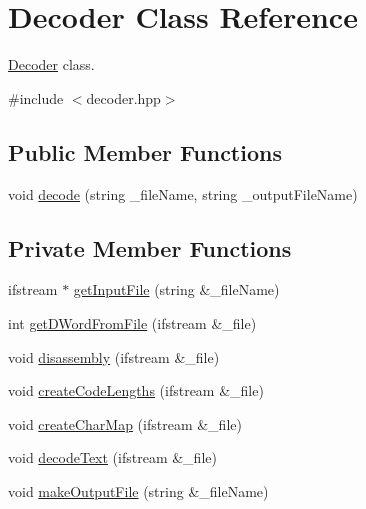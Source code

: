 \hypertarget{classDecoder}{}\section{Decoder Class Reference}
\label{classDecoder}


\hyperlink{classDecoder}{Decoder} class.  




{\ttfamily \#include $<$decoder.\+hpp$>$}

\subsection*{Public Member Functions}
\begin{DoxyCompactItemize}
\item 
void \hyperlink{classDecoder_a58a00f7fcc05d4734727309c2725375f}{decode} (string \+\_\+file\+Name, string \+\_\+output\+File\+Name)
\end{DoxyCompactItemize}
\subsection*{Private Member Functions}
\begin{DoxyCompactItemize}
\item 
ifstream $\ast$ \hyperlink{classDecoder_a27c84988ad41e51a3c968bbc3230b0dc}{get\+Input\+File} (string \&\+\_\+file\+Name)
\item 
int \hyperlink{classDecoder_a9a48c3df2256d5d17adb926030ff589f}{get\+D\+Word\+From\+File} (ifstream \&\+\_\+file)
\item 
void \hyperlink{classDecoder_ad26e1ce5bf9a96e576e662bdaed9b327}{disassembly} (ifstream \&\+\_\+file)
\item 
void \hyperlink{classDecoder_a7f788da286d8264414ae867c61ade0cc}{create\+Code\+Lengths} (ifstream \&\+\_\+file)
\item 
void \hyperlink{classDecoder_a36d6c189eaa1a68e9f495f4b86e8b551}{create\+Char\+Map} (ifstream \&\+\_\+file)
\item 
void \hyperlink{classDecoder_a74689c683481e7c3ea67ee4d8792efa4}{decode\+Text} (ifstream \&\+\_\+file)
\item 
void \hyperlink{classDecoder_a8d26727f97c511a5219236f323fce474}{make\+Output\+File} (string \&\+\_\+file\+Name)
\end{DoxyCompactItemize}

